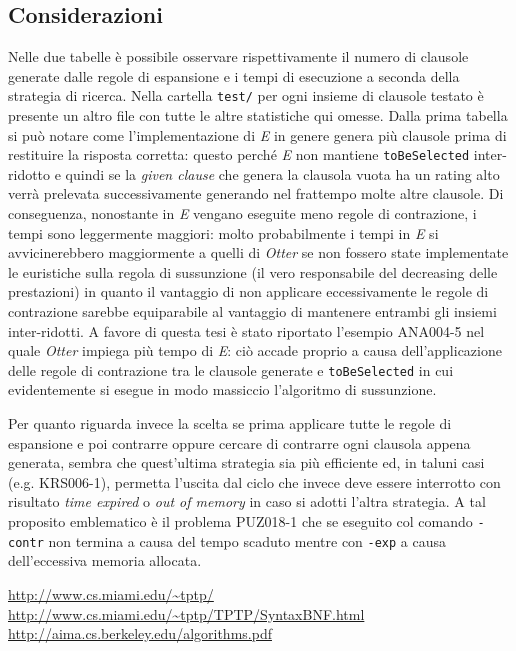 \documentclass[a4paper,11pt]{article}
\makeatletter
\let\@orig@endthebibliography\endthebibliography
\renewcommand\endthebibliography{
\xdef\@kept@last@number{\the\c@enumiv}
\@orig@endthebibliography}
\newenvironment{thesitography}[1]
{\def\refname{Siti consultati}%
\thebibliography{#1}%
\setcounter{enumiv}{\@kept@last@number}%
}
	{\@orig@endthebibliography}
\makeatother
\begin{document}
\subsection{Considerazioni}
Nelle due tabelle è possibile osservare rispettivamente il numero di clausole generate dalle regole di espansione e i tempi di esecuzione a seconda della strategia di ricerca. Nella cartella \texttt{test/} per ogni insieme di clausole testato è presente un altro file con tutte le altre statistiche qui omesse.
Dalla prima tabella si può notare come l'implementazione di \emph{E} in genere genera più clausole prima di restituire la risposta corretta: questo perché \emph{E} non mantiene \texttt{toBeSelected} inter-ridotto e quindi se la \emph{given clause} che genera la clausola vuota ha un rating alto verrà prelevata successivamente generando nel frattempo molte altre clausole. Di conseguenza, nonostante in \emph{E} vengano eseguite meno regole di contrazione, i tempi sono leggermente maggiori: molto probabilmente i tempi in \emph{E} si avvicinerebbero maggiormente a quelli di \emph{Otter} se non fossero state implementate le euristiche sulla regola di sussunzione (il vero responsabile del decreasing delle prestazioni) in quanto il vantaggio di non applicare eccessivamente le regole di contrazione sarebbe equiparabile al vantaggio di mantenere entrambi gli insiemi inter-ridotti. A favore di questa tesi è stato riportato l'esempio ANA004-5 nel quale \emph{Otter} impiega più tempo di \emph{E}: ciò accade proprio a causa dell'applicazione delle regole di contrazione tra le clausole generate e \texttt{toBeSelected} in cui evidentemente si esegue in modo massiccio l'algoritmo di sussunzione.\par
Per quanto riguarda invece la scelta se prima applicare tutte le regole di espansione e poi contrarre oppure cercare di contrarre ogni clausola appena generata, sembra che quest'ultima strategia sia più efficiente ed, in taluni casi (e.g. KRS006-1), permetta l'uscita dal ciclo che invece deve essere interrotto con risultato \emph{time expired} o \emph{out of memory} in caso si adotti l'altra strategia. A tal proposito emblematico è il problema PUZ018-1 che se eseguito col comando \texttt{-contr} non termina a causa del tempo scaduto mentre con \texttt{-exp} a causa dell'eccessiva memoria allocata.

\begin{thesitography}{9}
\url{http://www.cs.miami.edu/~tptp/}
\url{http://www.cs.miami.edu/~tptp/TPTP/SyntaxBNF.html}		
\url{http://aima.cs.berkeley.edu/algorithms.pdf}
\end{thesitography}
\end{document}
